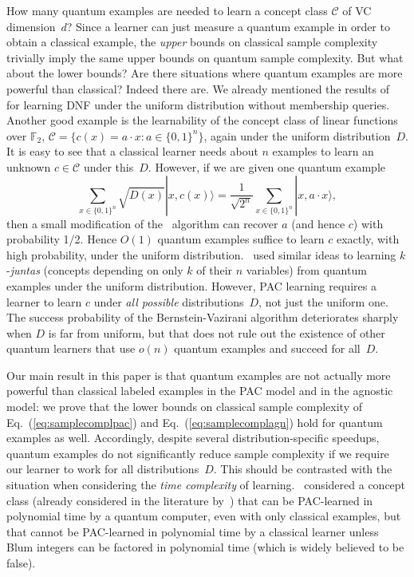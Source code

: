 \documentclass[twoside,11pt]{article}
\newcommand{\ket}[1]{|#1\rangle}
\def\01{\{0,1\}}
\newcommand{\C}{\ensuremath{\mathscr{C}}}
\begin{document}
How many quantum examples are needed to learn a concept class $\C$ of VC dimension~$d$?
Since a learner can just measure a quantum example in order to obtain a classical example, 
the \emph{upper} bounds on classical sample complexity trivially imply the same upper bounds on quantum sample complexity.
But what about the lower bounds?  Are there situations where quantum examples are more powerful than classical?  Indeed there are.  
We already mentioned the results of~\cite{bshouty:quantumpac} for learning DNF under the uniform distribution without membership queries.
Another good example is the learnability of the concept class of linear functions over $\mathbb{F}_2$, $\C=\{c(x)=a\cdot x: a\in\01^n\}$, again under the uniform distribution~$D$. It is easy to see that a classical learner needs about $n$ examples to learn an unknown $c\in\C$ under this~$D$. However, if we are given one quantum example
$$
\sum_{x\in\01^n}\sqrt{D(x)}\ket{x,c(x)}=\frac{1}{\sqrt{2^n}}\sum_{x\in\01^n}\ket{x,a\cdot x},
$$
then a small modification of the~\cite{bernstein&vazirani:qcomplexity} algorithm can recover $a$ (and hence $c$) with probability 1/2. Hence $O(1)$ quantum examples suffice to learn $c$ exactly, with high probability, under the uniform distribution.~\cite{atici&servedio:testing} used similar ideas to learning $k$-\emph{juntas} (concepts depending on only $k$ of their $n$ variables)
from quantum examples under the uniform distribution.
However, PAC learning requires a learner to learn $c$ under \emph{all possible} distributions~$D$, not just the uniform one. The success probability of the Bernstein-Vazirani algorithm deteriorates sharply when $D$ is far from uniform, but that does not rule out the existence of other quantum learners that use $o(n)$ quantum examples and succeed for all~$D$.

Our main result in this paper is that quantum examples are not actually more powerful than classical labeled examples in the PAC model and in the agnostic model: we prove that the lower bounds on classical sample complexity of Eq.~(\ref{eq:samplecomplpac}) and  Eq.~(\ref{eq:samplecomplagn}) hold for quantum examples as well.  Accordingly, despite several distribution-specific speedups, quantum examples do not significantly reduce sample complexity if we require our learner to work for all distributions~$D$. This should be contrasted with the situation when considering the \emph{time complexity} of learning.~\cite{servedio&gortler:equivalencequantumclassical} considered a concept class (already considered in the literature by~\cite{kearns&valiant:blum}) that can be PAC-learned in polynomial time by a quantum computer, even with only classical examples, but that cannot be PAC-learned in polynomial time by a classical learner unless Blum integers can be factored in polynomial time (which is widely believed to be false).  
\end{document}
